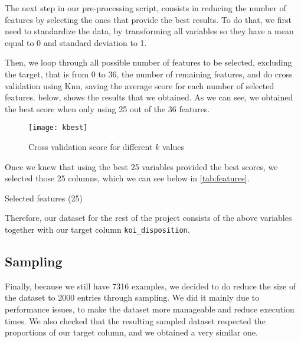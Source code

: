 The next step in our pre-processing script, consists in reducing the number of features
by selecting the ones that provide the best results. To do that, we first need to
standardize the data, by transforming all variables so they have a mean equal to 0
and standard deviation to 1.

Then, we loop through all possible number of features to be selected, 
excluding the target, that is from 0
to 36, the number of remaining features, and do cross validation using Knn, saving
the average score for each number of selected features. 
below, shows the results that we obtained. As we can see, we obtained the best score
when only using 25 out of the 36 features.

\begin{figure}[H]
    \centering
    \texttt{[image: kbest]}
    \caption{Cross validation score for different $k$ values}%
    \label{fig:feature_cross}
\end{figure}

Once we knew that using the best 25 variables provided the best scores, we selected
those 25 columns, which we can see below in \cref{tab:features}.

\begin{table}[H]
    \centering
    \caption{Selected features (25)}%
    \label{tab:features}
    
\end{table}

Therefore, our dataset for the rest of the project consists of the above variables
together with our target column \texttt{koi\_disposition}.

\subsection{Sampling}

Finally, because we still have 7316 examples, we decided to do reduce the size of the
dataset to 2000 entries through sampling. We did it mainly due to performance issues,
to make the dataset more manageable and reduce execution times. We also checked that
the resulting sampled dataset respected the proportions of our
target column, and we obtained a very similar one.